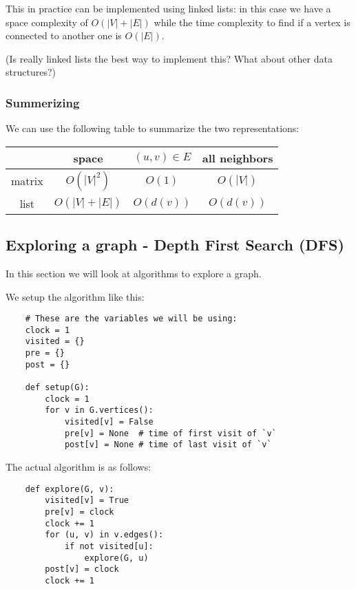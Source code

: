 \documentclass[10pt]{extarticle}
\begin{document}
This in practice can be implemented using linked lists: in this case we have a space complexity of $O(|V| + |E|)$ while the time complexity to find if a vertex is connected to another one is $O(|E|)$.

(Is really linked lists the best way to implement this? What about other data structures?)

\subsubsection{Summerizing}

We can use the following table to summarize the two representations:

\begin{center}
    \begin{tabular}{c|c|c|c}
               & space          & $(u, v) \in E$ & all neighbors \\
        \hline
        matrix & $O(|V|^2)$     & $O(1)$         & $O(|V|)$      \\
        list   & $O(|V| + |E|)$ & $O(d(v))$      & $O(d(v))$
    \end{tabular}
    \label{tab:graphrepr}
\end{center}

\subsection{Exploring a graph - Depth First Search (DFS)}

In this section we will look at algorithms to explore a graph.

We setup the algorithm like this:

\begin{verbatim}
    # These are the variables we will be using:
    clock = 1
    visited = {}
    pre = {}
    post = {}

    def setup(G):
        clock = 1
        for v in G.vertices():
            visited[v] = False
            pre[v] = None  # time of first visit of `v`
            post[v] = None # time of last visit of `v`
\end{verbatim}

The actual algorithm is as follows:

\begin{verbatim}
    def explore(G, v):
        visited[v] = True
        pre[v] = clock
        clock += 1
        for (u, v) in v.edges():
            if not visited[u]:
                explore(G, u)
        post[v] = clock
        clock += 1
\end{verbatim}
\end{document}
